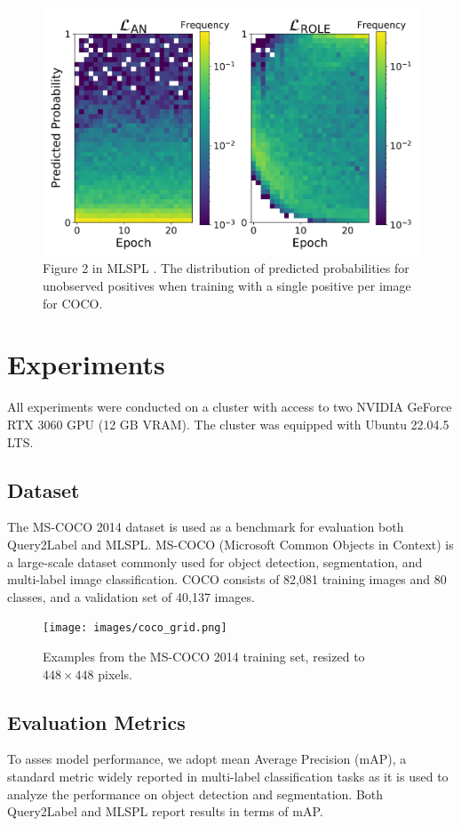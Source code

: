 \documentclass[lettersize,journal]{IEEEtran}
\begin{document}
\begin{figure}[h]
    \centering
    \includegraphics[width=.8\linewidth]{images/mlsp_fig2.png}
    \caption{Figure 2 in MLSPL \cite{mlsp}. The distribution of predicted probabilities for unobserved positives when training with a single positive per image for COCO.}
    \label{fig:mlsp_fig2}
\end{figure}



\section{Experiments}
All experiments were conducted on a cluster with access to two NVIDIA GeForce RTX 3060 GPU (12 GB VRAM). The cluster was equipped with Ubuntu 22.04.5 LTS.

\subsection{Dataset}
The MS-COCO 2014 \cite{coco14} dataset is used as a benchmark for evaluation both Query2Label and MLSPL. MS-COCO (Microsoft Common Objects in Context) is a large-scale dataset commonly used for object detection, segmentation, and multi-label image classification. COCO consists of 82,081 training images and 80 classes, and a validation set of 40,137 images.

\begin{figure}[t]
    \centering
    \texttt{[image: images/coco\_grid.png]}
    \caption{Examples from the MS-COCO 2014 training set, resized to $448 \times 448$ pixels.}
    \label{fig:coco-examples}
\end{figure}

\subsection{Evaluation Metrics}
To asses model performance, we adopt mean Average Precision (mAP), a standard metric widely reported in multi-label classification tasks as it is used to analyze the performance on object detection and segmentation. Both Query2Label and MLSPL report results in terms of mAP. 
\end{document}
